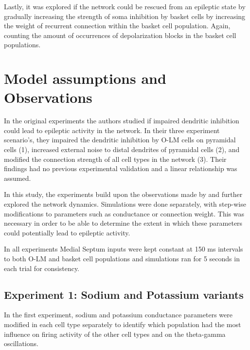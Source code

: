 Lastly, it was explored if the network could be rescued from an epileptic state by gradually increasing the strength of soma inhibition by basket cells 
by increasing the weight of recurrent connection within the basket cell population. Again, counting the amount of occurrences of depolarization blocks 
in the basket cell populations.
\pagebreak
\section{Model assumptions and Observations}
In the original experiments \textcite{sanjayImpairedDendriticInhibition2015} the authors studied if impaired dendritic 
inhibition could lead to epileptic activity in the network.
In their three experiment scenario's, they impaired the dendritic inhibition by O-LM cells on pyramidal cells (1), increased external noise to distal 
dendrites of pyramidal cells (2), and modified the connection strength of all cell types in the network (3). 
Their findings had no previous experimental validation and a linear relationship was assumed.

In this study, the experiments build upon the observations made by \textcite{sanjayImpairedDendriticInhibition2015} and further explored the network dynamics.
Simulations were done separately, with step-wise modifications to parameters such as conductance or connection weight.
This was necessary in order to be able to determine the extent in which these parameters could potentially lead to epileptic activity.

In all experiments Medial Septum inputs were kept constant at 150 ms intervals to both O-LM and basket cell populations 
and simulations ran for 5 seconds in each trial for consistency.

\subsection{Experiment 1: Sodium and Potassium variants}
In the first experiment, sodium and potassium conductance parameters were modified
in each cell type separately to identify which population had the most influence
on firing activity of the other cell types and on the theta-gamma oscillations.

